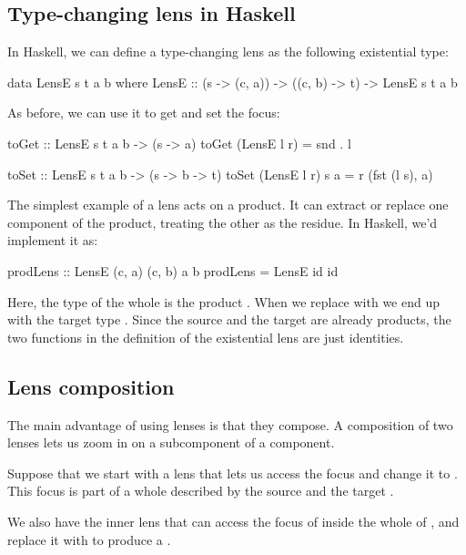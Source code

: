 \documentclass[DaoFP]{subfiles}
\begin{document}
\subsection{Type-changing lens in Haskell}
In Haskell, we can define a type-changing lens as the following existential type:
\begin{haskell}
data LensE s t a b where
  LensE :: (s -> (c, a)) -> ((c, b) -> t) -> LensE s t a b
\end{haskell}
As before, we can use it to get and set the focus:
\begin{haskell}
toGet :: LensE s t a b -> (s -> a)
toGet (LensE l r) = snd . l

toSet :: LensE s t a b -> (s -> b -> t)
toSet (LensE l r) s a = r (fst (l s), a)
\end{haskell}

The simplest example of a lens acts on a product. It can extract or replace one component of the product, treating the other as the residue. In Haskell, we'd implement it as:
\begin{haskell}
prodLens :: LensE (c, a) (c, b) a b
prodLens = LensE id id
\end{haskell}
Here, the type of the whole is the product . When we replace  with  we end up with the target type . Since the source and the target are already products, the two functions in the definition of the existential lens are just identities.

\subsection{Lens composition}

The main advantage of using lenses is that they compose. A composition of two lenses lets us zoom in on a subcomponent of a component. 

Suppose that we start with a lens that lets us access the focus   and change it to . This focus is part of a whole described by the source  and the target . 

We also have the inner lens that can access the focus of   inside the whole of , and replace it with  to produce a . 
\end{document}
